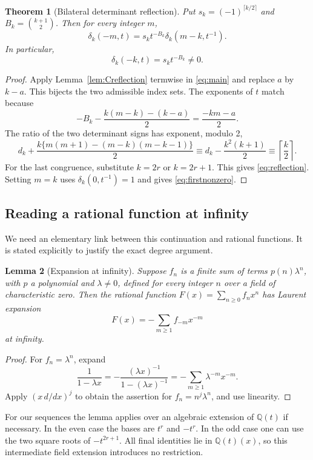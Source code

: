 \documentclass[11pt,letterpaper]{article}
\numberwithin{equation}{section}
\newtheorem{theorem}{Theorem}[section]
\newtheorem{lemma}[theorem]{Lemma}
\theoremstyle{definition}
\newcommand{\Q}{\mathbb Q}
\begin{document}
\begin{theorem}[Bilateral determinant reflection]\label{thm:reflection}
Put
\(s_k=(-1)^{\lceil k/2\rceil}\) and \(B_k=\binom{k+1}{2}\).
Then for every integer \(m\),
\begin{equation}\label{eq:reflection}
 \boxed{\displaystyle
 \delta_k(-m,t)=s_k t^{-B_k}\delta_k(m-k,t^{-1}).}
\end{equation}
In particular,
\begin{equation}\label{eq:firstnonzero}
 \delta_k(-k,t)=s_k t^{-B_k}\ne0.
\end{equation}
\end{theorem}
\begin{proof}
Apply Lemma~\ref{lem:Creflection} termwise in \eqref{eq:main} and
replace \(a\) by \(k-a\). This bijects the two admissible index sets.
The exponents of \(t\) match because
\[
 -B_k-\frac{k(m-k)-(k-a)}{2}=\frac{-km-a}{2}.
\]
The ratio of the two determinant signs has exponent, modulo 2,
\[
 d_k+\frac{k\{m(m+1)-(m-k)(m-k-1)\}}2
 \equiv d_k-\frac{k^2(k+1)}2
 \equiv\left\lceil\frac k2\right\rceil.
\]
For the last congruence, substitute \(k=2r\) or \(k=2r+1\).
This gives \eqref{eq:reflection}. Setting \(m=k\) uses
\(\delta_k(0,t^{-1})=1\) and gives \eqref{eq:firstnonzero}.
\end{proof}

\subsection{Reading a rational function at infinity}
We need an elementary link between this continuation and rational
functions. It is stated explicitly to justify the exact degree argument.

\begin{lemma}[Expansion at infinity]\label{lem:infinity}
Suppose \(f_n\) is a finite sum of terms \(p(n)\lambda^n\), with
\(p\) a polynomial and \(\lambda\ne0\), defined for every integer
\(n\) over a field of characteristic zero. Then the rational function
\(F(x)=\sum_{n\ge0}f_nx^n\) has Laurent expansion
\begin{equation}\label{eq:infinity}
 F(x)=-\sum_{m\ge1}f_{-m}x^{-m}
\end{equation}
at infinity.
\end{lemma}
\begin{proof}
For \(f_n=\lambda^n\), expand
\[
 \frac1{1-\lambda x}
 =-\frac{(\lambda x)^{-1}}{1-(\lambda x)^{-1}}
 =-\sum_{m\ge1}\lambda^{-m}x^{-m}.
\]
Apply \((x\,d/dx)^j\) to obtain the assertion for
\(f_n=n^j\lambda^n\), and use linearity.
\end{proof}
For our sequences the lemma applies over an algebraic extension of
\(\Q(t)\) if necessary. In the even case the bases are \(t^r\) and
\(-t^r\). In the odd case one can use the two square roots of
\(-t^{2r+1}\). All final identities lie in \(\Q(t)(x)\), so this
intermediate field extension introduces no restriction.
\end{document}
